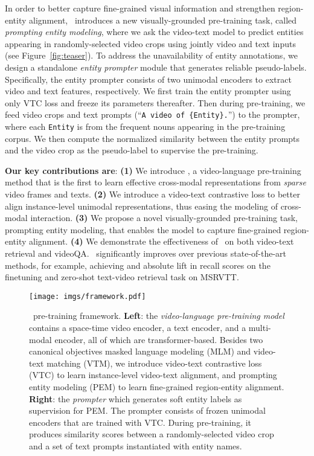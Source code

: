 \documentclass[10pt,twocolumn,letterpaper]{article}
\begin{document}
In order to better capture fine-grained visual information and strengthen region-entity alignment, \name~introduces a new visually-grounded pre-training task, called \emph{prompting entity modeling},
where we ask the video-text model to predict entities appearing in randomly-selected video crops using jointly video and text inputs (see Figure~\ref{fig:teaser}).
To address the unavailability of entity annotations, we design a standalone \emph{entity prompter} module that generates reliable pseudo-labels.
Specifically, the entity prompter consists of two unimodal encoders to extract video and text features, respectively.
We first train the entity prompter using only VTC loss and freeze its parameters thereafter.
Then during pre-training, we feed video crops and text prompts (\eg ``\texttt{A video of \{Entity\}.}'') to the prompter, where each \texttt{Entity} is from the frequent nouns appearing in the pre-training corpus.
We then compute the normalized similarity between the entity prompts and the video crop as the pseudo-label to supervise the pre-training.


\textbf{Our key contributions are}:
\textbf{(1)}
	We introduce \name, a video-language pre-training method that is the first to learn effective cross-modal representations from \emph{sparse} video frames and texts. \textbf{(2)}	We introduce a video-text contrastive loss to better align instance-level unimodal representations, thus easing the modeling of cross-modal interaction.
\textbf{(3)}	We propose a novel visually-grounded pre-training task, prompting entity modeling, that enables the model to capture fine-grained region-entity alignment.
\textbf{(4)}
	We demonstrate the effectiveness of \name~on both video-text retrieval and videoQA. \name~significantly improves over previous state-of-the-art methods, for example, achieving  and  absolute lift in recall scores on the finetuning and zero-shot text-video retrieval task on MSRVTT. 


 \begin{figure*}[ht]
\centering
  \texttt{[image: imgs/framework.pdf]}
\vspace{-7ex}
\caption{\name~pre-training framework. \textbf{Left}: the \textit{video-language pre-training model} contains a space-time video encoder, a text encoder, and a multi-modal encoder, all of which are transformer-based. Besides two canonical objectives masked language modeling (MLM) and video-text matching (VTM), we introduce video-text contrastive loss (VTC) to learn instance-level video-text alignment, and prompting entity modeling (PEM) to learn fine-grained region-entity alignment. 
\textbf{Right}: the \textit{prompter} which generates soft entity labels as supervision for PEM. The prompter consists of frozen unimodal encoders that are trained with VTC. During pre-training, it produces similarity scores between a randomly-selected video crop and a set of text prompts instantiated with entity names.
}
\vspace{-1em}
\label{fig:arch}
\end{figure*}
\end{document}
